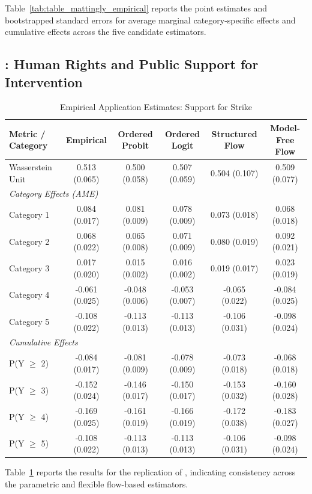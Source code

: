 \documentclass{article}
\numberwithin{figure}{section}
\numberwithin{table}{section}
\numberwithin{equation}{section}
\begin{document}
Table~\ref{tab:table_mattingly_empirical} reports the point estimates and bootstrapped standard errors for average marginal category-specific effects and cumulative effects across the five candidate estimators.


\subsection{\citet{Tomz2020a}: Human Rights and Public Support for Intervention}

\begin{table}[htbp]
\centering
\caption{Empirical Application Estimates: Support for Strike \citep{Tomz2020a}}
\label{tab:table_tomz_empirical}
\small
\begin{tabular}{lccccc}
\toprule
\textbf{Metric / Category} & \textbf{Empirical} & \textbf{Ordered Probit} & \textbf{Ordered Logit} & \textbf{Structured Flow} & \textbf{Model-Free Flow} \\
\midrule
Wasserstein Unit & 0.513 (0.065) & 0.500 (0.058) & 0.507 (0.059) & 0.504 (0.107) & 0.509 (0.077) \\
\midrule
\multicolumn{6}{l}{\textit{Category Effects (AME)}} \\
  Category 1 & 0.084 (0.017)  & 0.081 (0.009)  & 0.078 (0.009)  & 0.073 (0.018)  & 0.068 (0.018) \\
  Category 2 & 0.068 (0.022)  & 0.065 (0.008)  & 0.071 (0.009)  & 0.080 (0.019)  & 0.092 (0.021) \\
  Category 3 & 0.017 (0.020)  & 0.015 (0.002)  & 0.016 (0.002)  & 0.019 (0.017)  & 0.023 (0.019) \\
  Category 4 & -0.061 (0.025) & -0.048 (0.006) & -0.053 (0.007) & -0.065 (0.022) & -0.084 (0.025) \\
  Category 5 & -0.108 (0.022) & -0.113 (0.013) & -0.113 (0.013) & -0.106 (0.031) & -0.098 (0.024) \\
\midrule
\multicolumn{6}{l}{\textit{Cumulative Effects}} \\
  P(Y $\ge$ 2) & -0.084 (0.017) & -0.081 (0.009) & -0.078 (0.009) & -0.073 (0.018) & -0.068 (0.018) \\
  P(Y $\ge$ 3) & -0.152 (0.024) & -0.146 (0.017) & -0.150 (0.017) & -0.153 (0.032) & -0.160 (0.028) \\
  P(Y $\ge$ 4) & -0.169 (0.025) & -0.161 (0.019) & -0.166 (0.019) & -0.172 (0.038) & -0.183 (0.027) \\
  P(Y $\ge$ 5) & -0.108 (0.022) & -0.113 (0.013) & -0.113 (0.013) & -0.106 (0.031) & -0.098 (0.024) \\
\bottomrule
\end{tabular}
\end{table}

Table~\ref{tab:table_tomz_empirical} reports the results for the replication of \citet{Tomz2020a}, indicating consistency across the parametric and flexible flow-based estimators.


\clearpage


\end{document}
